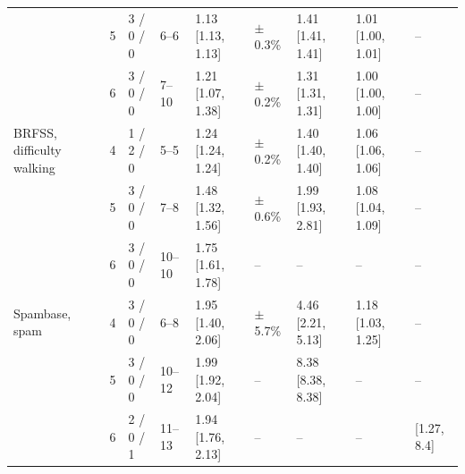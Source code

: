 \begin{table}[h]
\begin{tabular}{lllllllll}
 & 5 & 3 / 0 / 0 & 6--6 & 1.13 [1.13, 1.13] & $\pm$0.3\% & 1.41 [1.41, 1.41] & 1.01 [1.00, 1.01] & -- \\
 & 6 & 3 / 0 / 0 & 7--10 & 1.21 [1.07, 1.38] & $\pm$0.2\% & 1.31 [1.31, 1.31] & 1.00 [1.00, 1.00] & -- \\
BRFSS, difficulty walking & 4 & 1 / 2 / 0 & 5--5 & 1.24 [1.24, 1.24] & $\pm$0.2\% & 1.40 [1.40, 1.40] & 1.06 [1.06, 1.06] & -- \\
 & 5 & 3 / 0 / 0 & 7--8 & 1.48 [1.32, 1.56] & $\pm$0.6\% & 1.99 [1.93, 2.81] & 1.08 [1.04, 1.09] & -- \\
 & 6 & 3 / 0 / 0 & 10--10 & 1.75 [1.61, 1.78] & -- & -- & -- & -- \\
Spambase, spam & 4 & 3 / 0 / 0 & 6--8 & 1.95 [1.40, 2.06] & $\pm$5.7\% & 4.46 [2.21, 5.13] & 1.18 [1.03, 1.25] & -- \\
 & 5 & 3 / 0 / 0 & 10--12 & 1.99 [1.92, 2.04] & -- & 8.38 [8.38, 8.38] & -- & -- \\
 & 6 & 2 / 0 / 1 & 11--13 & 1.94 [1.76, 2.13] & -- & -- & -- & [1.27, 8.4] \\
\bottomrule
\end{tabular}
\end{table}
